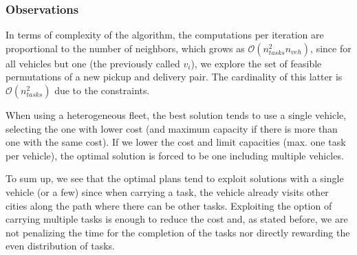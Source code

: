 \documentclass[11pt]{article}
\begin{document}
\subsubsection{Observations}
\begin{minipage}{0.35\textwidth}
\label{tab:configurations}
\end{minipage}{}
\hfill
\begin{minipage}{0.6\textwidth}
In terms of complexity of the algorithm, the computations per iteration are proportional to the number of neighbors, which grows as $\mathcal{O}(n_{tasks}^2 n_{veh})$, since for all vehicles but one (the previously called $v_i$), we explore the set of feasible permutations of a new pickup and delivery pair. The cardinality of this latter is $\mathcal{O}(n_{tasks}^2)$ due to the constraints.


\end{minipage}

When using a heterogeneous fleet, the best solution tends to use a single vehicle, selecting the one with lower cost (and maximum capacity if there is more than one with the same cost). If we lower the cost and limit capacities (max. one task per vehicle), the optimal solution is forced to be one including multiple vehicles. 

To sum up, we see that the optimal plans tend to exploit solutions with a single vehicle (or a few) since when carrying a task, the vehicle already visits other cities along the path where there can be other tasks. Exploiting the option of carrying multiple tasks is enough to reduce the cost and, as stated before, we are not penalizing the time for the completion of the tasks nor directly rewarding the even distribution of tasks.

\end{document}
